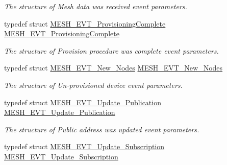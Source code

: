 \begin{DoxyCompactItemize}
\begin{DoxyCompactList}\small\item\em The structure of Mesh data was received event parameters. \end{DoxyCompactList}\item 
typedef struct \hyperlink{struct_m_e_s_h___e_v_t___provisioning_complete}{M\+E\+S\+H\+\_\+\+E\+V\+T\+\_\+\+Provisioning\+Complete} \hyperlink{group___m_e_s_h_ga0e0b94cd22f973ad5f1dd80173a76fbc}{M\+E\+S\+H\+\_\+\+E\+V\+T\+\_\+\+Provisioning\+Complete}\hypertarget{group___m_e_s_h_ga0e0b94cd22f973ad5f1dd80173a76fbc}{}\label{group___m_e_s_h_ga0e0b94cd22f973ad5f1dd80173a76fbc}

\begin{DoxyCompactList}\small\item\em The structure of Provision procedure was complete event parameters. \end{DoxyCompactList}\item 
typedef struct \hyperlink{struct_m_e_s_h___e_v_t___new___nodes}{M\+E\+S\+H\+\_\+\+E\+V\+T\+\_\+\+New\+\_\+\+Nodes} \hyperlink{group___m_e_s_h_ga0807ff103f6a2d98dc11aa071242ec4f}{M\+E\+S\+H\+\_\+\+E\+V\+T\+\_\+\+New\+\_\+\+Nodes}\hypertarget{group___m_e_s_h_ga0807ff103f6a2d98dc11aa071242ec4f}{}\label{group___m_e_s_h_ga0807ff103f6a2d98dc11aa071242ec4f}

\begin{DoxyCompactList}\small\item\em The structure of Un-\/provisioned device event parameters. \end{DoxyCompactList}\item 
typedef struct \hyperlink{struct_m_e_s_h___e_v_t___update___publication}{M\+E\+S\+H\+\_\+\+E\+V\+T\+\_\+\+Update\+\_\+\+Publication} \hyperlink{group___m_e_s_h_ga689557a847282e89bac4831aac37e424}{M\+E\+S\+H\+\_\+\+E\+V\+T\+\_\+\+Update\+\_\+\+Publication}\hypertarget{group___m_e_s_h_ga689557a847282e89bac4831aac37e424}{}\label{group___m_e_s_h_ga689557a847282e89bac4831aac37e424}

\begin{DoxyCompactList}\small\item\em The structure of Public address was updated event parameters. \end{DoxyCompactList}\item 
typedef struct \hyperlink{struct_m_e_s_h___e_v_t___update___subscription}{M\+E\+S\+H\+\_\+\+E\+V\+T\+\_\+\+Update\+\_\+\+Subscription} \hyperlink{group___m_e_s_h_ga4ddf73f26e703bcd103920a8573641e2}{M\+E\+S\+H\+\_\+\+E\+V\+T\+\_\+\+Update\+\_\+\+Subscription}\hypertarget{group___m_e_s_h_ga4ddf73f26e703bcd103920a8573641e2}{}\label{group___m_e_s_h_ga4ddf73f26e703bcd103920a8573641e2}


\end{DoxyCompactItemize}
